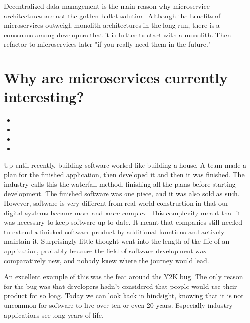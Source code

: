 Decentralized data management is the main reason why microservice architectures are not the golden bullet solution. Although the benefits of microservices outweigh monolith architectures in the long run, there is a consensus among developers that it is better to start with a monolith. Then refactor to microservices later "if you really need them in the future." ~\cite{krivtsov.2019}


\section{Why are microservices currently interesting?}
\label{sec:theory:interesting}

\begin{itemize}
  \item {}
  \item {}
  \item {}
  \item {}
\end{itemize}

Up until recently, building software worked like building a house. A team made a plan for the finished application, then developed it and then it was finished. The industry calls this the waterfall method, finishing all the plans before starting development. The finished software was one piece, and it was also sold as such. However, software is very different from real-world construction in that our digital systems became more and more complex. This complexity meant that it was necessary to keep software up to date. It meant that companies still needed to extend a finished software product by additional functions and actively maintain it. Surprisingly little thought went into the length of the life of an application, probably because the field of software development was comparatively new, and nobody knew where the journey would lead.

An excellent example of this was the fear around the Y2K bug. The only reason for the bug was that developers hadn't considered that people would use their product for so long. Today we can look back in hindsight, knowing that it is not uncommon for software to live over ten or even 20 years. Especially industry applications see long years of life.

